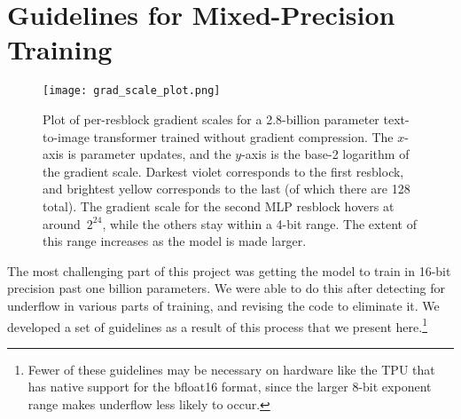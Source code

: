 \documentclass{article}
\begin{document}
\section{Guidelines for Mixed-Precision Training}
\label{sec:mp_train_guidelines}
\begin{figure}[t]
    \centering
    \texttt{[image: grad\_scale\_plot.png]}
    \caption{Plot of per-resblock gradient scales for a 2.8-billion parameter text-to-image transformer trained without gradient compression. The $x$-axis is parameter updates, and the $y$-axis is the base-2 logarithm of the gradient scale. Darkest violet corresponds to the first resblock, and brightest yellow corresponds to the last (of which there are 128 total). The gradient scale for the second MLP resblock hovers at around~$2^{24}$, while the others stay within a 4-bit range. The extent of this range increases as the model is made larger.}
    \label{fig:grad_scale_plot}
\end{figure}
The most challenging part of this project was getting the model to train in 16-bit precision past one billion parameters. We were able to do this after detecting for underflow in various parts of training, and revising the code to eliminate it. We developed a set of guidelines as a result of this process that we present here.\footnote{Fewer of these guidelines may be necessary on hardware like the TPU that has native support for the bfloat16 format, since the larger 8-bit exponent range makes underflow less likely to occur.}
\end{document}
